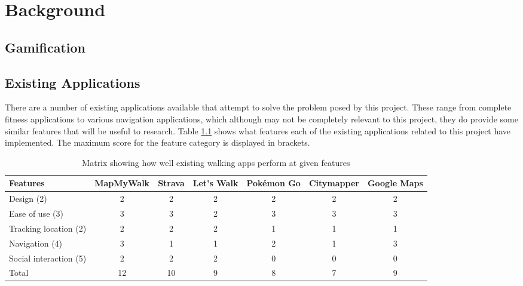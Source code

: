 \chapter{Background}

\section{Gamification}


\section{Existing Applications}


There are a number of existing applications available that attempt to solve the problem posed by this project. These range from complete fitness applications to various navigation applications, which although may not be completely relevant to this project, they do provide some similar features that will be useful to research. Table \ref{table:existing-walking-apps} shows what features each of the existing applications related to this project have implemented. The maximum score for the feature category is displayed in brackets.

\begin{table}[htb]
  \centering
  \begin{tabular}{|m{2cm}||c|c|c|c|c|c|}
    \hline
    Features & MapMyWalk & Strava & Let's Walk & Pok\'{e}mon Go & Citymapper & Google Maps\\
    \hline
    \hline
    Design (2) & 2 & 2 & 2 & 2 & 2 & 2\\
    \hline
    Ease of use (3) & 3 & 3 & 2 & 3 & 3 & 3\\
    \hline
    Tracking location (2) & 2 & 2 & 2 & 1 & 1 & 1\\
    \hline
    Navigation (4) & 3 & 1 & 1 & 2 & 1 & 3\\
    \hline
    Social interaction (5) & 2 & 2 & 2 & 0 & 0 & 0\\
    \hline
    \hline
    Total & 12 & 10 & 9 & 8 & 7 & 9\\
    \hline
  \end{tabular}
  \caption{Matrix showing how well existing walking apps perform at given features}
  \label{table:existing-walking-apps}
\end{table}

